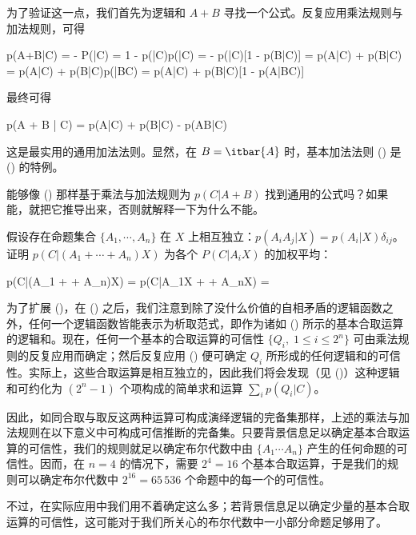 为了验证这一点，我们首先为逻辑和 $A + B$ 寻找一个公式。反复应用乘法规则与加法规则，可得

\placeformula[2-65]
\startformula
\startmathmatrix[align={middle, middle, left}]
\NC p(A+B|C) \NC =  - P(|C) = 1 - p(|C)p(|C)\NR
\NC \NC =  - p(|C)[1 - p(B|C)] = p(A|C) + p(B|C)\NR
\NC \NC = \NC p(A|C) + p(B|C)p(|BC) = p(A|C) + p(B|C)[1 - p(A|BC)]\NR
\stopmathmatrix
\stopformula

最终可得

\placeformula[2-66]
\startformula
p(A + B | C) = p(A|C) + p(B|C) - p(AB|C)
\stopformula

这是最实用的通用加法法则。显然，在 $B = \itbar{A}$ 时，基本加法法则 (\in[2-64]) 是 (\in[2-66]) 的特例。

\startExercise
能够像 (\in[2-66]) 那样基于乘法与加法规则为 $p(C|A + B)$ 找到通用的公式吗？如果能，就把它推导出来，否则就解释一下为什么不能。
\stopExercise

\startExercise
假设存在命题集合 $\{A_1,\cdots,A_n\}$ 在 $X$ 上相互独立：$p(A_iA_j|X) = p(A_i|X)\delta_{ij}$。证明 $p(C|(A_1 + \cdots + A_n)X)$ 为各个 $P(C|A_iX)$ 的加权平均：

\placeformula[2-67]
\startformula
p(C|(A_1 + \cdots + A_n)X) = p(C|A_1X + \cdots + A_nX) = 
\stopformula
\stopExercise

为了扩展 (\in[2-66])，在 (\in[1-17]) 之后，我们注意到除了没什么价值的自相矛盾的逻辑函数之外，任何一个逻辑函数皆能表示为析取范式，即作为诸如 (\in[1-17]) 所示的基本合取运算的逻辑和。现在，任何一个基本的合取运算的可信性 $\{Q_i,\; 1\le i \le 2^n\}$ 可由乘法规则的反复应用而确定；然后反复应用 (\in[2-66]) 便可确定 $Q_i$ 所形成的任何逻辑和的可信性。实际上，这些合取运算是相互独立的，因此我们将会发现（见 (\in[2-85])）这种逻辑和可约化为 $(2^n - 1)$ 个项构成的简单求和运算 $\sum_ip(Q_i|C)$。

因此，如同合取与取反这两种运算可构成演绎逻辑的完备集那样，上述的乘法与加法规则在以下意义中可构成可信推断的完备集。只要背景信息足以确定基本合取运算的可信性，我们的规则就足以确定布尔代数中由 $\{A_1\cdots A_n\}$ 产生的任何命题的可信性。因而，在 $n = 4$ 的情况下，需要 $2^4 = 16$ 个基本合取运算，于是我们的规则可以确定布尔代数中 $2^{16} = 65\,536$ 个命题中的每一个的可信性。

不过，在实际应用中我们用不着确定这么多；若背景信息足以确定少量的基本合取运算的可信性，这可能对于我们所关心的布尔代数中一小部分命题足够用了。

